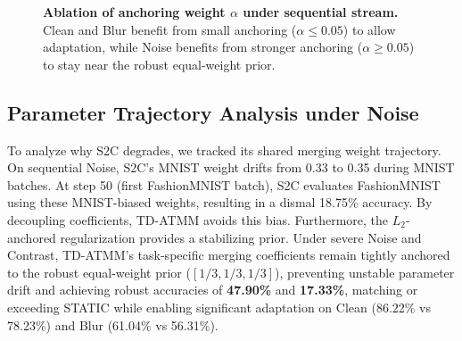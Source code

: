 \documentclass{article}
\theoremstyle{plain}
\theoremstyle{definition}
\theoremstyle{remark}
\begin{document}
\begin{figure}[t]
\centering
{}
\caption{\textbf{Ablation of anchoring weight $\alpha$ under sequential stream.} Clean and Blur benefit from small anchoring ($\alpha \le 0.05$) to allow adaptation, while Noise benefits from stronger anchoring ($\alpha \ge 0.05$) to stay near the robust equal-weight prior.}
\label{fig:ablation}
\end{figure}

\subsection{Parameter Trajectory Analysis under Noise}
To analyze why S2C degrades, we tracked its shared merging weight trajectory. On sequential Noise, S2C's MNIST weight drifts from 0.33 to 0.35 during MNIST batches. At step 50 (first FashionMNIST batch), S2C evaluates FashionMNIST using these MNIST-biased weights, resulting in a dismal 18.75\% accuracy. 
By decoupling coefficients, TD-ATMM avoids this bias. Furthermore, the $L_2$-anchored regularization provides a stabilizing prior. Under severe Noise and Contrast, TD-ATMM's task-specific merging coefficients remain tightly anchored to the robust equal-weight prior ($[1/3, 1/3, 1/3]$), preventing unstable parameter drift and achieving robust accuracies of \textbf{47.90\%} and \textbf{17.33\%}, matching or exceeding STATIC while enabling significant adaptation on Clean (86.22\% vs 78.23\%) and Blur (61.04\% vs 56.31\%).
\end{document}
